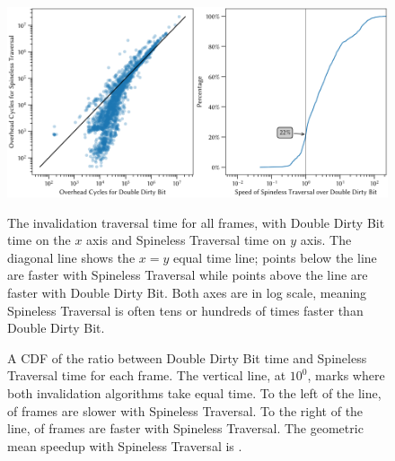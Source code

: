\begin{figure}
\includegraphics[scale=0.4]{DBPQ.png}
\begin{minipage}[t]{0.48\linewidth}
\caption{
The invalidation traversal time for all \NumFrames frames,
    with Double Dirty Bit time on the $x$ axis
    and Spineless Traversal time on $y$ axis.
The diagonal line shows the $x = y$ equal time line;
    points below the line are faster with Spineless Traversal
    while points above the line are faster with Double Dirty Bit.
Both axes are in log scale, meaning Spineless Traversal is often
    tens or hundreds of times faster than Double Dirty Bit.
}
\label{fig:xy}
\end{minipage}\hfill%
\begin{minipage}[t]{0.48\linewidth}
\caption{
  A CDF of the ratio between
    Double Dirty Bit time and Spineless Traversal time
    for each frame.
  The vertical line, at $10^0$,
    marks where both invalidation algorithms take equal time.
  To the left of the line,
    \PctSlower of frames are slower with Spineless Traversal.
  To the right of the line,
    \PctFaster of frames are faster with Spineless Traversal.
  The geometric mean speedup with Spineless Traversal
    is \MeanSpeedup.}
\label{fig:cdf}
\end{minipage}
\end{figure}

